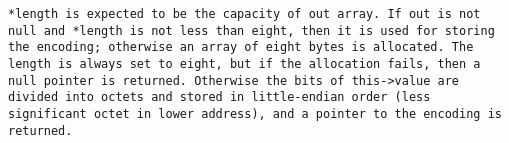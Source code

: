 \tt{*length} is expected to be the capacity of \tt{out} array.
If \tt{out} is not null and \tt{*length} is not less than eight, then it is
used for storing the encoding; otherwise an array of eight bytes is allocated.
The length is always set to eight, but if the
allocation fails, then a null pointer is returned.
Otherwise the bits of \tt{this->value} are divided into octets
and stored in little-endian order (less significant octet in
lower address), and a pointer to the encoding is returned.
